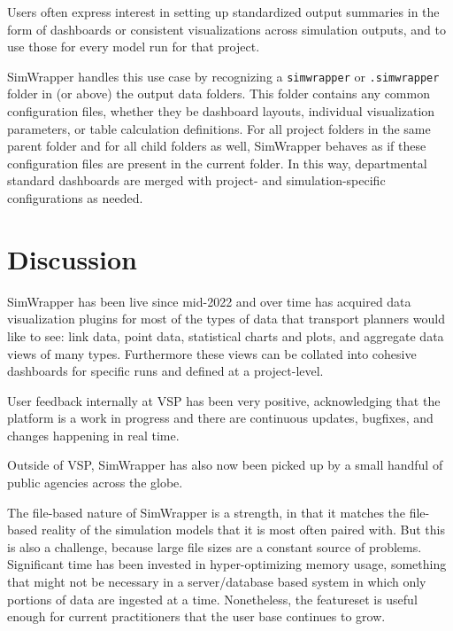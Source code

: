 Users often express interest in setting up standardized output summaries in the form of dashboards or consistent visualizations across simulation outputs, and to use those for every model run for that project.

SimWrapper handles this use case by recognizing a \texttt{simwrapper} or \texttt{.simwrapper} folder in (or above) the output data folders. This folder contains any common configuration files, whether they be dashboard layouts, individual visualization parameters, or table calculation definitions. For all project folders in the same parent folder and for all child folders as well, SimWrapper behaves as if these configuration files are present in the current folder. In this way, departmental standard dashboards are merged with project- and simulation-specific configurations as needed.


\hypertarget{simwrapper-discussion}{%
\section{Discussion}\label{simwrapper-discussion}}

SimWrapper has been live since mid-2022 and over time has acquired data visualization plugins for most of the types of data that transport planners would like to see: link data, point data, statistical charts and plots, and aggregate data views of many types. Furthermore these views can be collated into cohesive dashboards for specific runs and defined at a project-level.

User feedback internally at VSP has been very positive, acknowledging that the platform is a work in progress and there are continuous updates, bugfixes, and changes happening in real time.

Outside of VSP, SimWrapper has also now been picked up by a small handful of public agencies across the globe.

The file-based nature of SimWrapper is a strength, in that it matches the file-based reality of the simulation models that it is most often paired with. But this is also a challenge, because large file sizes are a constant source of problems. Significant time has been invested in hyper-optimizing memory usage, something that might not be necessary in a server/database based system in which only portions of data are ingested at a time. Nonetheless, the featureset is useful enough for current practitioners that the user base continues to grow.

